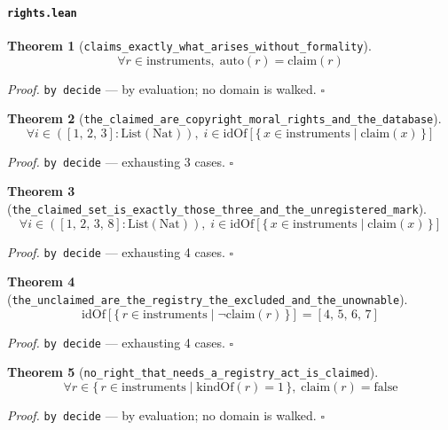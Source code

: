 \documentclass[11pt]{article}
\newtheorem{theorem}{Theorem}[section]
\begin{document}
\paragraph{\texttt{rights.lean}}

\begin{theorem}[\texttt{claims\_exactly\_what\_arises\_without\_formality}]
\[ \forall r \in \mathrm{instruments},\; \mathrm{auto}\mathopen{}\left(r\right) = \mathrm{claim}\mathopen{}\left(r\right) \]
\end{theorem}
\noindent\emph{Proof.} \texttt{by decide} --- by evaluation; no domain is walked. \hfill$\square$

\begin{theorem}[\texttt{the\_claimed\_are\_copyright\_moral\_rights\_and\_the\_database}]
\[ \forall i \in \left([1,\,2,\,3] : \mathrm{List}\mathopen{}\left(\mathrm{Nat}\right)\right),\; i \in \mathrm{idOf}[\{\, x \in \mathrm{instruments} \mid \mathrm{claim}\mathopen{}\left(x\right) \,\}] \]
\end{theorem}
\noindent\emph{Proof.} \texttt{by decide} --- exhausting 3 cases. \hfill$\square$

\begin{theorem}[\texttt{the\_claimed\_set\_is\_exactly\_those\_three\_and\_the\_unregistered\_mark}]
\[ \forall i \in \left([1,\,2,\,3,\,8] : \mathrm{List}\mathopen{}\left(\mathrm{Nat}\right)\right),\; i \in \mathrm{idOf}[\{\, x \in \mathrm{instruments} \mid \mathrm{claim}\mathopen{}\left(x\right) \,\}] \]
\end{theorem}
\noindent\emph{Proof.} \texttt{by decide} --- exhausting 4 cases. \hfill$\square$

\begin{theorem}[\texttt{the\_unclaimed\_are\_the\_registry\_the\_excluded\_and\_the\_unownable}]
\[ \mathrm{idOf}[\{\, r \in \mathrm{instruments} \mid \lnot \mathrm{claim}\mathopen{}\left(r\right) \,\}] = [4,\,5,\,6,\,7] \]
\end{theorem}
\noindent\emph{Proof.} \texttt{by decide} --- exhausting 4 cases. \hfill$\square$

\begin{theorem}[\texttt{no\_right\_that\_needs\_a\_registry\_act\_is\_claimed}]
\[ \forall r \in \{\, r \in \mathrm{instruments} \mid \mathrm{kindOf}\mathopen{}\left(r\right) = 1 \,\},\; \mathrm{claim}\mathopen{}\left(r\right) = \mathrm{false} \]
\end{theorem}
\noindent\emph{Proof.} \texttt{by decide} --- by evaluation; no domain is walked. \hfill$\square$
\end{document}
